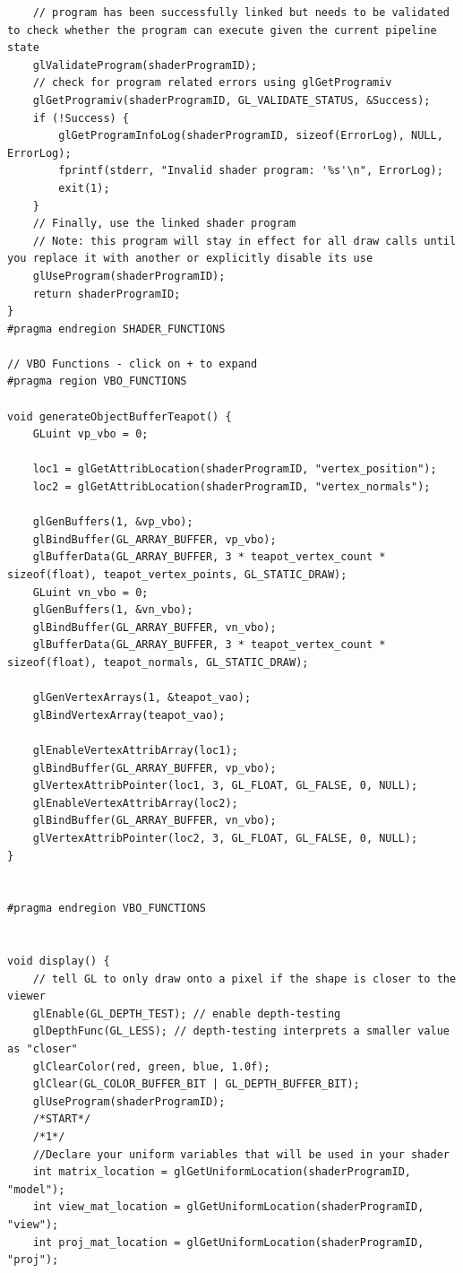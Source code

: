 \documentclass{article}
\begin{document}
\begin{lstlisting}
	// program has been successfully linked but needs to be validated to check whether the program can execute given the current pipeline state
	glValidateProgram(shaderProgramID);
	// check for program related errors using glGetProgramiv
	glGetProgramiv(shaderProgramID, GL_VALIDATE_STATUS, &Success);
	if (!Success) {
		glGetProgramInfoLog(shaderProgramID, sizeof(ErrorLog), NULL, ErrorLog);
		fprintf(stderr, "Invalid shader program: '%s'\n", ErrorLog);
		exit(1);
	}
	// Finally, use the linked shader program
	// Note: this program will stay in effect for all draw calls until you replace it with another or explicitly disable its use
	glUseProgram(shaderProgramID);
	return shaderProgramID;
}
#pragma endregion SHADER_FUNCTIONS

// VBO Functions - click on + to expand
#pragma region VBO_FUNCTIONS

void generateObjectBufferTeapot() {
	GLuint vp_vbo = 0;

	loc1 = glGetAttribLocation(shaderProgramID, "vertex_position");
	loc2 = glGetAttribLocation(shaderProgramID, "vertex_normals");

	glGenBuffers(1, &vp_vbo);
	glBindBuffer(GL_ARRAY_BUFFER, vp_vbo);
	glBufferData(GL_ARRAY_BUFFER, 3 * teapot_vertex_count * sizeof(float), teapot_vertex_points, GL_STATIC_DRAW);
	GLuint vn_vbo = 0;
	glGenBuffers(1, &vn_vbo);
	glBindBuffer(GL_ARRAY_BUFFER, vn_vbo);
	glBufferData(GL_ARRAY_BUFFER, 3 * teapot_vertex_count * sizeof(float), teapot_normals, GL_STATIC_DRAW);

	glGenVertexArrays(1, &teapot_vao);
	glBindVertexArray(teapot_vao);

	glEnableVertexAttribArray(loc1);
	glBindBuffer(GL_ARRAY_BUFFER, vp_vbo);
	glVertexAttribPointer(loc1, 3, GL_FLOAT, GL_FALSE, 0, NULL);
	glEnableVertexAttribArray(loc2);
	glBindBuffer(GL_ARRAY_BUFFER, vn_vbo);
	glVertexAttribPointer(loc2, 3, GL_FLOAT, GL_FALSE, 0, NULL);
}


#pragma endregion VBO_FUNCTIONS


void display() {
	// tell GL to only draw onto a pixel if the shape is closer to the viewer
	glEnable(GL_DEPTH_TEST); // enable depth-testing
	glDepthFunc(GL_LESS); // depth-testing interprets a smaller value as "closer"
	glClearColor(red, green, blue, 1.0f);
	glClear(GL_COLOR_BUFFER_BIT | GL_DEPTH_BUFFER_BIT);
	glUseProgram(shaderProgramID);
	/*START*/
	/*1*/
	//Declare your uniform variables that will be used in your shader
	int matrix_location = glGetUniformLocation(shaderProgramID, "model");
	int view_mat_location = glGetUniformLocation(shaderProgramID, "view");
	int proj_mat_location = glGetUniformLocation(shaderProgramID, "proj");


\end{lstlisting}
\end{document}
